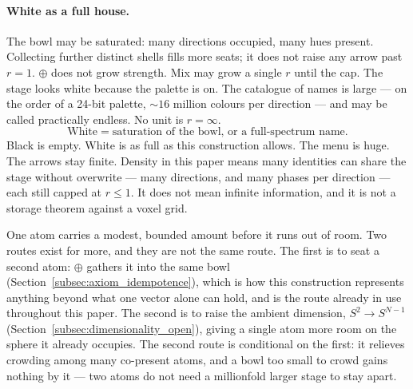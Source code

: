 \documentclass[12pt, a4paper]{article}
\begin{document}
\paragraph{White as a full house.}
The bowl may be saturated: many directions occupied, many hues present.
Collecting further distinct shells fills more seats; it does not raise
any arrow past $r=1$. $\oplus$ does not grow strength. Mix may grow a
single $r$ until the cap. The stage looks white because the palette is on. The catalogue
of names is large --- on the order of a 24-bit palette,
$\sim 16$ million colours per direction --- and may be called
practically endless. No unit is $r=\infty$.
\begin{equation}
    \text{White} \;=\; \text{saturation of the bowl, or a full-spectrum name.}
    \label{eq:white_state}
\end{equation}
Black is empty. White is as full as this construction allows. The
menu is huge. The arrows stay finite.
Density in this paper means many identities can share the stage
without overwrite --- many directions, and many phases per direction
--- each still capped at $r\le 1$. It does not mean infinite
information, and it is not a storage theorem against a voxel grid.

One atom carries a modest, bounded amount before it runs out of room.
Two routes exist for more, and they are not the same route. The first
is to seat a second atom: $\oplus$ gathers it into the same bowl
(Section~\ref{subsec:axiom_idempotence}), which is how this
construction represents anything beyond what one vector alone can
hold, and is the route already in use throughout this paper. The
second is to raise the ambient dimension, $S^2\to S^{N-1}$
(Section~\ref{subsec:dimensionality_open}), giving a single atom more room
on the sphere it already occupies. The second route is conditional on
the first: it relieves crowding among many co-present atoms, and a
bowl too small to crowd gains nothing by it --- two atoms do not
need a millionfold larger stage to stay apart.
\end{document}
